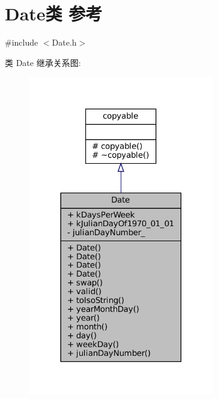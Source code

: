 \hypertarget{classmuduo_1_1Date}{}\section{Date类 参考}
\label{classmuduo_1_1Date}


{\ttfamily \#include $<$Date.\+h$>$}



类 Date 继承关系图\+:
\nopagebreak
\begin{figure}[H]
\begin{center}
\leavevmode
\includegraphics[width=230pt]{classmuduo_1_1Date__inherit__graph}
\end{center}
\end{figure}


